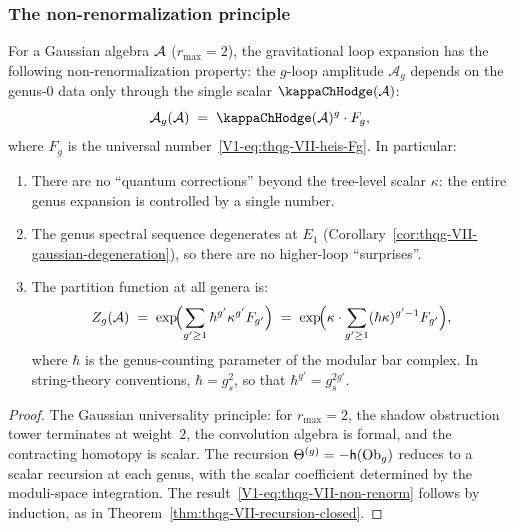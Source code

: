 \subsubsection{The non-renormalization principle}

\begin{theorem}
For a Gaussian algebra $\mathcal{A}$ \textup{(}$r_{\max} = 2$\textup{)},
the gravitational loop expansion has the following
non-renormalization property: the $g$-loop amplitude
$\mathcal{A}_g$ depends on the genus-$0$ data only through
the single scalar $\kappaChHodge(\cA)$:
\begin{equation}%
\mathcal{A}_g(\cA)
\;=\;
\kappaChHodge(\cA)^g \cdot F_g,
\end{equation}
where $F_g$ is the universal number~\eqref{V1-eq:thqg-VII-heis-Fg}.
In particular:
\begin{enumerate}[label=\textup{(\roman*)}]
\item There are no ``quantum corrections'' beyond the
 tree-level scalar $\kappa$: the entire genus expansion is
 controlled by a single number.
\item The genus spectral sequence degenerates at $E_1$
 \textup{(}Corollary~\textup{\ref{cor:thqg-VII-gaussian-degeneration})},
 so there are no higher-loop ``surprises''.
\item The partition function at all genera is:
 \begin{equation}%
 Z_g(\cA)
 \;=\;
 \exp\!\Bigl(\sum_{g' \geq 1} \hbar^{g'}
 \kappa^{g'} F_{g'}\Bigr)
 \;=\;
 \exp\!\Bigl(\kappa \cdot
 \sum_{g' \geq 1} (\hbar\kappa)^{g'-1} F_{g'}\Bigr),
 \end{equation}
 where $\hbar$ is the genus-counting parameter of the modular
 bar complex. In string-theory conventions, $\hbar = g_s^2$,
 so that $\hbar^{g'} = g_s^{2g'}$.
\end{enumerate}
\end{theorem}

\begin{proof}
The Gaussian universality principle: for $r_{\max} = 2$, the
shadow obstruction tower terminates at weight~$2$, the convolution algebra
is formal, and the contracting homotopy is scalar. The
recursion $\Theta^{(g)} = -\mathsf{h}(\mathrm{Ob}_g)$ reduces to a scalar
recursion at each genus, with the scalar coefficient
determined by the moduli-space integration. The
result~\eqref{V1-eq:thqg-VII-non-renorm} follows by induction,
as in Theorem~\ref{thm:thqg-VII-recursion-closed}.
\end{proof}

